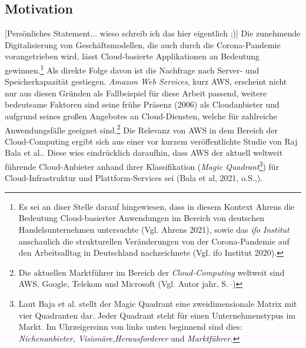 \subsection{Motivation}
[Persönliches Statement... wieso schreib ich das hier eigentlich ;)] Die zunehmende Digitalisierung von Geschäftsmodellen, die auch durch die Corona-Pandemie vorangetrieben wird, lässt Cloud-basierte Applikationen an Bedeutung gewinnen.\footnote{Es sei an diser Stelle darauf hingewiesen, dass in diesem Kontext Ahrens die Bedeutung Cloud-basierter Anwendungen im Bereich von deutschen Handelsunternehmen untersuchte (Vgl. Ahrens 2021)\cite{STA3}, sowie das \textit{ifo Institut} anschaulich die strukturellen Veränderungen von der Corona-Pandemie auf den Arbeitsalltag in Deutschland nachzeichnete (Vgl. ifo Institut 2020)\cite{STA2}.} Als direkte Folge davon ist die Nachfrage nach Server- und Speicherkapazität gestiegen.
\textit{Amazon Web Services}, kurz AWS, erscheint nicht nur aus diesen Gründen als Fallbeispiel für diese Arbeit passend, weitere bedeutsame Faktoren sind seine frühe Präsenz (2006) als Cloudanbieter und aufgrund seines großen Angebotes an Cloud-Diensten, welche für zahlreiche Anwendungsfälle geeignet sind.\footnote{ Die aktuellen Marktführer im Bereich der \textit{Cloud-Computing} weltweit sind AWS, Google, Telekom und Microsoft (Vgl. Autor jahr, S.--)}
Die Relevanz von AWS in dem Bereich der Cloud-Computing ergibt sich aus einer vor kurzem veröffentlichte Studie von Raj Bala et al.. Diese wies eindrücklich daraufhin, dass AWS der aktuell weltweit führende Cloud-Anbieter anhand ihrer Klassifikation (\textit{Magic Quadrant}\footnote{ Laut Baja et al. stellt der Magic Quadrant eine zweidimensionale Matrix mit vier Quadranten dar. Jeder Quadrant steht für einen Unternehmenstypus im Markt. Im Uhrzeigersinn von links unten beginnend sind dies: \textit{Nichenanbieter, Visionäre,Herausforderer} und\textit{ Marktführer.}}) für Cloud-Infrastruktur und Plattform-Services sei (Bala et al, 2021, o.S.,\cite{G01}).
